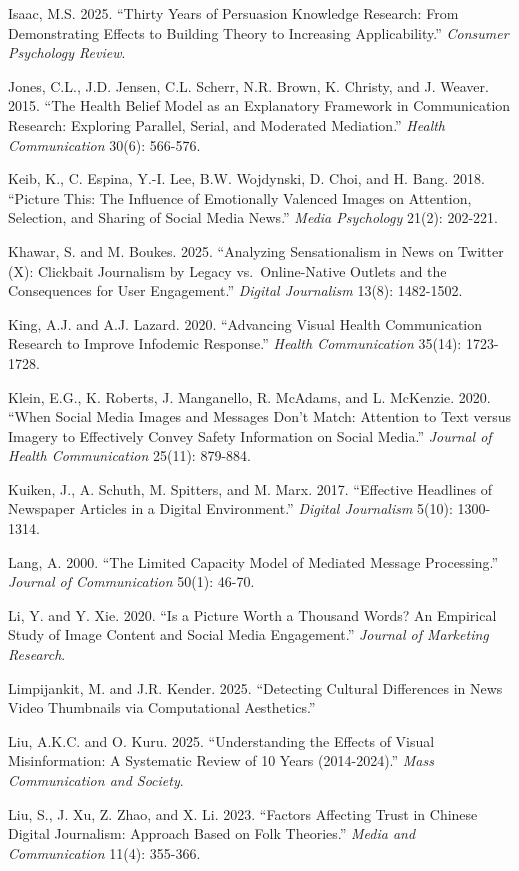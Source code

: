 \documentclass[
  fontset=none]{ctexart}
\begin{document}
Isaac, M.S. 2025. ``Thirty Years of Persuasion Knowledge Research: From Demonstrating Effects to Building Theory to Increasing Applicability.'' \emph{Consumer Psychology Review}.

Jones, C.L., J.D. Jensen, C.L. Scherr, N.R. Brown, K. Christy, and J. Weaver. 2015. ``The Health Belief Model as an Explanatory Framework in Communication Research: Exploring Parallel, Serial, and Moderated Mediation.'' \emph{Health Communication} 30(6): 566-576.

Keib, K., C. Espina, Y.-I. Lee, B.W. Wojdynski, D. Choi, and H. Bang. 2018. ``Picture This: The Influence of Emotionally Valenced Images on Attention, Selection, and Sharing of Social Media News.'' \emph{Media Psychology} 21(2): 202-221.

Khawar, S. and M. Boukes. 2025. ``Analyzing Sensationalism in News on Twitter (X): Clickbait Journalism by Legacy vs.~Online-Native Outlets and the Consequences for User Engagement.'' \emph{Digital Journalism} 13(8): 1482-1502.

King, A.J. and A.J. Lazard. 2020. ``Advancing Visual Health Communication Research to Improve Infodemic Response.'' \emph{Health Communication} 35(14): 1723-1728.

Klein, E.G., K. Roberts, J. Manganello, R. McAdams, and L. McKenzie. 2020. ``When Social Media Images and Messages Don't Match: Attention to Text versus Imagery to Effectively Convey Safety Information on Social Media.'' \emph{Journal of Health Communication} 25(11): 879-884.

Kuiken, J., A. Schuth, M. Spitters, and M. Marx. 2017. ``Effective Headlines of Newspaper Articles in a Digital Environment.'' \emph{Digital Journalism} 5(10): 1300-1314.

Lang, A. 2000. ``The Limited Capacity Model of Mediated Message Processing.'' \emph{Journal of Communication} 50(1): 46-70.

Li, Y. and Y. Xie. 2020. ``Is a Picture Worth a Thousand Words? An Empirical Study of Image Content and Social Media Engagement.'' \emph{Journal of Marketing Research}.

Limpijankit, M. and J.R. Kender. 2025. ``Detecting Cultural Differences in News Video Thumbnails via Computational Aesthetics.''

Liu, A.K.C. and O. Kuru. 2025. ``Understanding the Effects of Visual Misinformation: A Systematic Review of 10 Years (2014-2024).'' \emph{Mass Communication and Society}.

Liu, S., J. Xu, Z. Zhao, and X. Li. 2023. ``Factors Affecting Trust in Chinese Digital Journalism: Approach Based on Folk Theories.'' \emph{Media and Communication} 11(4): 355-366.
\end{document}
